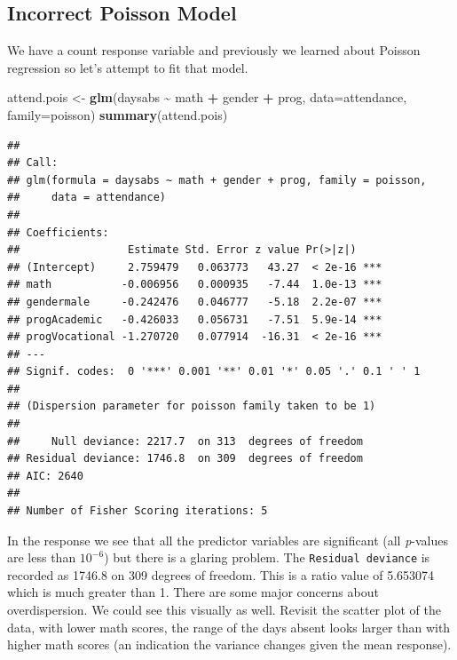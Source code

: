 \documentclass[
]{book}
\newenvironment{Shaded}{\begin{snugshade}}{\end{snugshade}}
\newcommand{\AttributeTok}[1]{\textcolor[rgb]{0.13,0.29,0.53}{#1}}
\newcommand{\FunctionTok}[1]{\textcolor[rgb]{0.13,0.29,0.53}{\textbf{#1}}}
\newcommand{\NormalTok}[1]{#1}
\newcommand{\OtherTok}[1]{\textcolor[rgb]{0.56,0.35,0.01}{#1}}
\newcommand{\SpecialCharTok}[1]{\textcolor[rgb]{0.81,0.36,0.00}{\textbf{#1}}}
\begin{document}
\hypertarget{incorrect-poisson-model}{%
\subsection{Incorrect Poisson Model}\label{incorrect-poisson-model}}

We have a count response variable and previously we learned about Poisson regression so let's attempt to fit that model.

\begin{Shaded}
\begin{Highlighting}[]
\NormalTok{attend.pois }\OtherTok{\textless{}{-}} \FunctionTok{glm}\NormalTok{(daysabs }\SpecialCharTok{\textasciitilde{}}\NormalTok{ math }\SpecialCharTok{+}\NormalTok{ gender }\SpecialCharTok{+}\NormalTok{ prog, }\AttributeTok{data=}\NormalTok{attendance, }\AttributeTok{family=}\NormalTok{poisson)}
\FunctionTok{summary}\NormalTok{(attend.pois)}
\end{Highlighting}
\end{Shaded}

\begin{verbatim}
## 
## Call:
## glm(formula = daysabs ~ math + gender + prog, family = poisson, 
##     data = attendance)
## 
## Coefficients:
##                 Estimate Std. Error z value Pr(>|z|)    
## (Intercept)     2.759479   0.063773   43.27  < 2e-16 ***
## math           -0.006956   0.000935   -7.44  1.0e-13 ***
## gendermale     -0.242476   0.046777   -5.18  2.2e-07 ***
## progAcademic   -0.426033   0.056731   -7.51  5.9e-14 ***
## progVocational -1.270720   0.077914  -16.31  < 2e-16 ***
## ---
## Signif. codes:  0 '***' 0.001 '**' 0.01 '*' 0.05 '.' 0.1 ' ' 1
## 
## (Dispersion parameter for poisson family taken to be 1)
## 
##     Null deviance: 2217.7  on 313  degrees of freedom
## Residual deviance: 1746.8  on 309  degrees of freedom
## AIC: 2640
## 
## Number of Fisher Scoring iterations: 5
\end{verbatim}

In the response we see that all the predictor variables are significant (all \emph{p}-values are less than \(10^{-6}\)) but there is a glaring problem. The \texttt{Residual\ deviance} is recorded as 1746.8 on 309 degrees of freedom. This is a ratio value of 5.653074 which is much greater than 1. There are some major concerns about overdispersion. We could see this visually as well. Revisit the scatter plot of the data, with lower math scores, the range of the days absent looks larger than with higher math scores (an indication the variance changes given the mean response).
\end{document}
